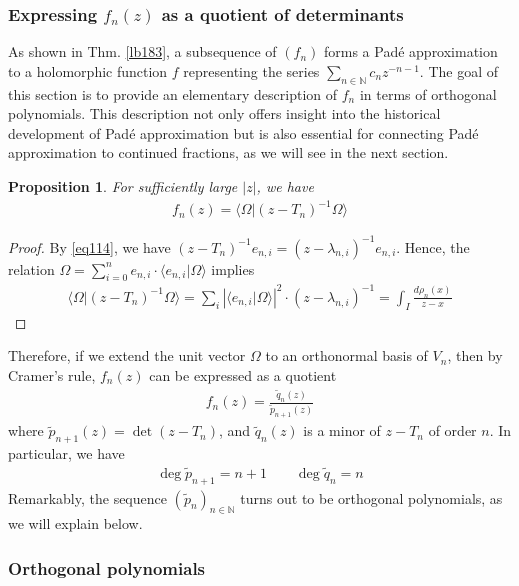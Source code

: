 \documentclass[12pt,b5paper,notitlepage]{article}
\theoremstyle{definition}
\theoremstyle{plain}
\newtheorem{pp}[df]{Proposition}
\newcommand{\wtd}{\widetilde}
\newcommand{\bk}[1]{\langle {#1}\rangle}
\newcommand{\bigbk}[1]{\big\langle {#1}\big\rangle}
\newcommand{\Nbb}{\mathbb N}
\numberwithin{equation}{section}
\begin{document}
\subsubsection{Expressing $f_n(z)$ as a quotient of determinants}\label{lb191}


As shown in Thm. \ref{lb183}, a subsequence of $(f_n)$ forms a Pad\'e approximation to a holomorphic function $f$ representing the series $\sum_{n\in\Nbb}c_nz^{-n-1}$. The goal of this section is to provide an elementary description of $f_n$ in terms of orthogonal polynomials. This description not only offers insight into the historical development of Pad\'e approximation but is also essential for connecting Pad\'e approximation to continued fractions, as we will see in the next section.


\begin{pp}\label{lb195}
For sufficiently large $|z|$, we have
\begin{align*}
f_n(z)=\bigbk{\Omega\big|(z-T_n)^{-1}\Omega}
\end{align*}
\end{pp}

\begin{proof}
By \eqref{eq114}, we have $(z-T_n)^{-1}e_{n,i}=(z-\lambda_{n,i})^{-1}e_{n,i}$. Hence, the relation $\Omega=\sum_{i=0}^n e_{n,i}\cdot\bk{e_{n,i}|\Omega}$ implies
\begin{align*}
\bigbk{\Omega\big|(z-T_n)^{-1}\Omega}=\sum_i |\bk{e_{n,i}|\Omega}|^2\cdot (z-\lambda_{n,i})^{-1}=\int_I\frac{d\rho_n(x)}{z-x}
\end{align*}
\end{proof}


Therefore, if we extend the unit vector $\Omega$ to an orthonormal basis of $V_n$, then by Cramer's rule, $f_n(z)$ can be expressed as a quotient 
\begin{align}\label{eq104}
f_n(z)=\frac{\wtd q_n(z)}{\wtd p_{n+1}(z)}
\end{align}
where $\wtd p_{n+1}(z)=\det(z-T_n)$, and $\wtd q_n(z)$ is a minor of $z-T_n$ of order $n$. In particular, we have
\begin{align*}
\deg\wtd p_{n+1}=n+1\qquad \deg\wtd q_n=n
\end{align*}
Remarkably, the sequence $(\wtd p_n)_{n\in\Nbb}$ turns out to be orthogonal polynomials, as we will explain below.



\subsubsection{Orthogonal polynomials}
\end{document}

